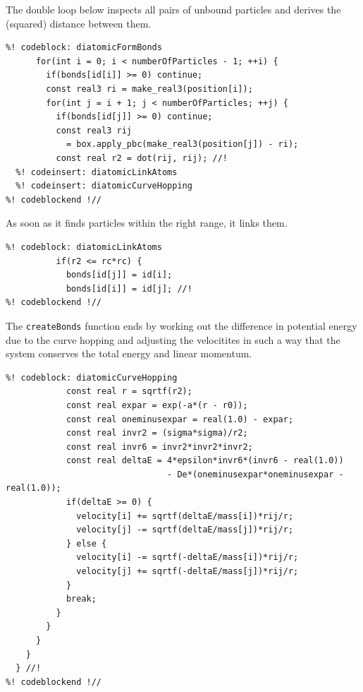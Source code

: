 The double loop below inspects all pairs of unbound particles and derives the 
(squared) distance between them.
\begin{lstlisting}
%! codeblock: diatomicFormBonds
      for(int i = 0; i < numberOfParticles - 1; ++i) {
        if(bonds[id[i]] >= 0) continue;
        const real3 ri = make_real3(position[i]);
        for(int j = i + 1; j < numberOfParticles; ++j) {
          if(bonds[id[j]] >= 0) continue;
          const real3 rij
            = box.apply_pbc(make_real3(position[j]) - ri);
          const real r2 = dot(rij, rij); //!
  %! codeinsert: diatomicLinkAtoms
  %! codeinsert: diatomicCurveHopping
%! codeblockend !//
\end{lstlisting}
As soon as it finds particles within the right range, it links them.
\begin{lstlisting}
%! codeblock: diatomicLinkAtoms
          if(r2 <= rc*rc) {
            bonds[id[j]] = id[i];
            bonds[id[i]] = id[j]; //!
%! codeblockend !//
\end{lstlisting}
The \texttt{createBonds} function ends by working out the difference in 
potential energy due to the curve hopping and adjusting the velocitites in such 
a way that the system conserves the total energy and linear momentum.
\begin{lstlisting}
%! codeblock: diatomicCurveHopping
            const real r = sqrtf(r2);
            const real expar = exp(-a*(r - r0));
            const real oneminusexpar = real(1.0) - expar;
            const real invr2 = (sigma*sigma)/r2;
            const real invr6 = invr2*invr2*invr2;
            const real deltaE = 4*epsilon*invr6*(invr6 - real(1.0))
                                - De*(oneminusexpar*oneminusexpar - real(1.0));
            if(deltaE >= 0) {
              velocity[i] += sqrtf(deltaE/mass[i])*rij/r;
              velocity[j] -= sqrtf(deltaE/mass[j])*rij/r;
            } else {
              velocity[i] -= sqrtf(-deltaE/mass[i])*rij/r;
              velocity[j] += sqrtf(-deltaE/mass[j])*rij/r;
            }
            break;
          }
        }
      }
    }
  } //!
%! codeblockend !//
\end{lstlisting}

